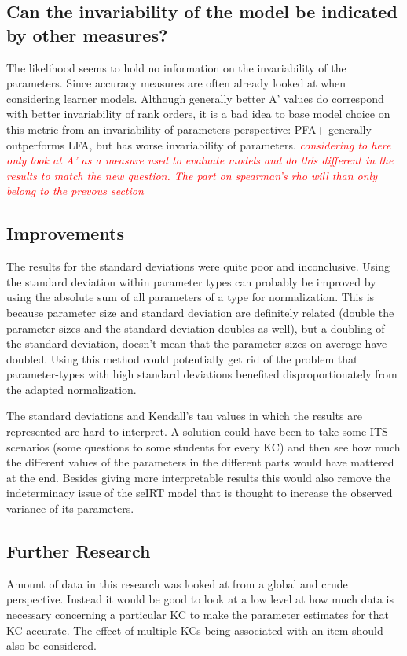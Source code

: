 \documentclass{scrartcl}
\newcommand\todo[1]{\textit{\textcolor{red}{#1}}}
\begin{document}
\subsection{Can the invariability of the model be indicated by other measures?}
The likelihood seems to hold no information on the invariability of the parameters. Since accuracy measures are often already looked at when considering learner models. Although generally better A' values do correspond with better invariability of rank orders, it is a bad idea to base model choice on this metric from an invariability of parameters perspective: PFA+ generally outperforms LFA, but has worse invariability of parameters.
\todo{considering to here only look at A' as a measure used to evaluate models and do this different in the results to match the new question. The part on spearman's rho will than only belong to the prevous section}  

\subsection{Improvements}
The results for the standard deviations were quite poor and inconclusive. Using the standard deviation within parameter types can probably be improved by using the absolute sum of all parameters of a type for normalization. This is because parameter size and standard deviation are definitely related (double the parameter sizes and the standard deviation doubles as well), but a doubling of the standard deviation, doesn't mean that the parameter sizes on average have doubled. Using this method could potentially get rid of the problem that parameter-types with high standard deviations benefited disproportionately from the adapted normalization.

The standard deviations and Kendall's tau values in which the results are represented are hard to interpret. A solution could have been to take some ITS scenarios (some questions to some students for every KC) and then see how much the different values of the parameters in the different parts would have mattered at the end. Besides giving more interpretable results this would also remove the indeterminacy issue of the seIRT model that is thought to increase the observed variance of its parameters.



\subsection{Further Research}
Amount of data in this research was looked at from a global and crude perspective. Instead it would be good to look at a low level at how much data is necessary concerning a particular KC to make the parameter estimates for that KC accurate. The effect of multiple KCs being associated with an item should also be considered.
\end{document}
